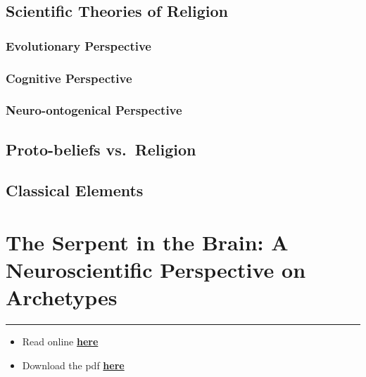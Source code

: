 \documentclass[
]{book}
\providecommand{\tightlist}{%
  \setlength{\itemsep}{0pt}\setlength{\parskip}{0pt}}
\begin{document}
\hypertarget{scientific-theories-of-religion}{%
\section{Scientific Theories of Religion}\label{scientific-theories-of-religion}}

\hypertarget{evolutionary-perspective}{%
\subsection{Evolutionary Perspective}\label{evolutionary-perspective}}

\hypertarget{cognitive-perspective}{%
\subsection{Cognitive Perspective}\label{cognitive-perspective}}

\hypertarget{neuro-ontogenical-perspective}{%
\subsection{Neuro-ontogenical Perspective}\label{neuro-ontogenical-perspective}}

\hypertarget{proto-beliefs-vs.-religion}{%
\section{Proto-beliefs vs.~Religion}\label{proto-beliefs-vs.-religion}}

\hypertarget{classical-elements}{%
\section{Classical Elements}\label{classical-elements}}

\hypertarget{the-serpent-in-the-brain-a-neuroscientific-perspective-on-archetypes}{%
\chapter{The Serpent in the Brain: A Neuroscientific Perspective on Archetypes}\label{the-serpent-in-the-brain-a-neuroscientific-perspective-on-archetypes}}

\begin{center}\rule{0.5\linewidth}{0.5pt}\end{center}

\begin{itemize}
\tightlist
\item
  Read online \href{https://dominiquemakowski.github.io/archetypes/}{\textbf{here}}
\item
  Download the pdf \href{https://github.com/DominiqueMakowski/archetypes/raw/master/pdf/archetypes_makowski.pdf}{\textbf{here}}
\end{itemize}
\end{document}

